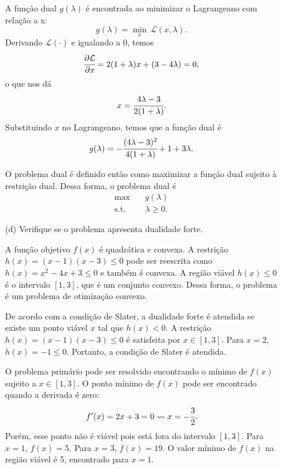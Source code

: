 \documentclass[11pt,a4paper]{article}
\begin{document}
\begin{enumerate}
\begin{itemize}
            A função dual $g(\lambda)$ é encontrada ao minimizar o Lagrangeano com relação a x:
            \begin{equation*}
                g(\lambda) = \underset{x}{\min} \, \mathcal{L}(x, \lambda).
            \end{equation*}
            Derivando $\mathcal{L}(\cdot)$ e igualando a 0, temos
            \begin{equation*}
                \cfrac{\partial \mathcal{L}}{\partial x} = 2(1+\lambda)x + (3-4\lambda) = 0,
            \end{equation*}
            \noindent o que nos dá
            \begin{equation*}
                x = \cfrac{4\lambda - 3}{2(1+\lambda)}.
            \end{equation*}
            Substituindo $x$ no Lagrangeano, temos que a função dual é
            \begin{equation*}
                g(\lambda) = -\cfrac{(4\lambda - 3)^2}{4(1+\lambda)} + 1 + 3\lambda.
            \end{equation*}

            O problema dual é definido então como maximizar a função dual sujeito à restrição dual. Dessa forma, o problema dual é
            \begin{equation*}
                \begin{aligned}
                    \max \quad & g(\lambda)\\
                    \text{s.t.} \quad & \lambda \geq 0. 
                \end{aligned}
            \end{equation*}
            \item[(d)] Verifique se o problema apresenta dualidade forte.
            
            A função objetivo $f(x)$ é quadrática e convexa. A restrição $h(x) = (x-1)(x-3) \leq 0$ pode ser reescrita como $h(x) = x^2 - 4x + 3 \leq 0$ e também é convexa. A região viável $h(x) \leq 0$ é o intervalo $[1,3]$, que é um conjunto convexo. Dessa forma, o problema é um problema de otimização convexo. 

            De acordo com a condição de Slater, a dualidade forte é atendida se existe um ponto viável $x$ tal que $h(x) < 0$. A restrição $h(x) = (x-1)(x-3) \leq 0$ é satisfeita por $x \in [1,3]$. Para $x = 2$, $h(x) = -1 \leq 0$. Portanto, a condição de Slater é atendida.

            O problema primário pode ser resolvido encontrando o mínimo de $f(x)$ sujeito a $x \in [1,3]$. O ponto mínimo de $f(x)$ pode ser encontrado quando a derivada é zero:
            \begin{equation*}
                f'(x) = 2x + 3 = 0 \leadsto x = -\cfrac{3}{2}.
            \end{equation*}
            Porém, esse ponto não é viável pois está fora do intervalo $[1,3]$. Para $x=1$, $f(x) = 5$. Para $x = 3$, $f(x) = 19$. O valor mínimo de $f(x)$ na região viável é 5, encontrado para $x=1$.


\end{itemize}
\end{enumerate}
\end{document}
